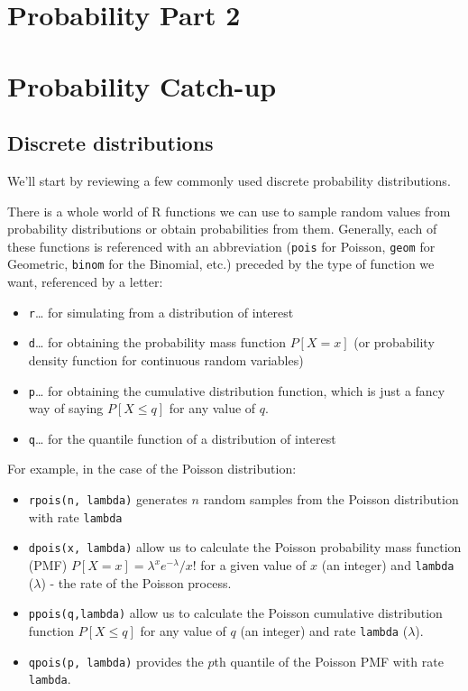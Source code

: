 \documentclass[
]{book}
\providecommand{\tightlist}{%
  \setlength{\itemsep}{0pt}\setlength{\parskip}{0pt}}
\begin{document}
\hypertarget{probability-part-2}{%
\chapter{Probability Part 2}\label{probability-part-2}}

\hypertarget{probability-catch-up}{%
\chapter{Probability Catch-up}\label{probability-catch-up}}

\hypertarget{discrete-distributions}{%
\section{Discrete distributions}\label{discrete-distributions}}

We'll start by reviewing a few commonly used discrete probability distributions.

There is a whole world of R functions we can use to sample random values from probability distributions or obtain probabilities from them. Generally, each of these functions is referenced with an abbreviation (\texttt{pois} for Poisson, \texttt{geom} for Geometric, \texttt{binom} for the Binomial, etc.) preceded by the type of function we want, referenced by a letter:

\begin{itemize}
\tightlist
\item
  \texttt{r}\ldots{} for simulating from a distribution of interest
\item
  \texttt{d}\ldots{} for obtaining the probability mass function \(P[X=x]\) (or probability density function for continuous random variables)
\item
  \texttt{p}\ldots{} for obtaining the cumulative distribution function, which is just a fancy way of saying \(P[X \leq q]\) for any value of \(q\).
\item
  \texttt{q}\ldots{} for the quantile function of a distribution of interest
\end{itemize}

For example, in the case of the Poisson distribution:

\begin{itemize}
\tightlist
\item
  \texttt{rpois(n,\ lambda)} generates \(n\) random samples from the Poisson distribution with rate \texttt{lambda}
\item
  \texttt{dpois(x,\ lambda)} allow us to calculate the Poisson probability mass function (PMF) \(P[X=x] = \lambda^x e^{-\lambda}/x!\) for a given value of \(x\) (an integer) and \texttt{lambda} (\(\lambda\)) - the rate of the Poisson process.
\item
  \texttt{ppois(q,lambda)} allow us to calculate the Poisson cumulative distribution function \(P[X \leq q]\) for any value of \(q\) (an integer) and rate \texttt{lambda} (\(\lambda\)).
\item
  \texttt{qpois(p,\ lambda)} provides the \(p\)th quantile of the Poisson PMF with rate \texttt{lambda}.
\end{itemize}
\end{document}
